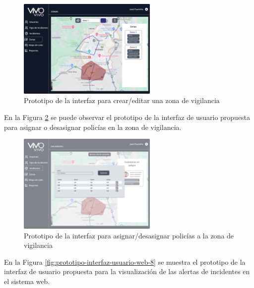 \begin{figure}[H]
      \centering
      \includegraphics[width=0.6\textwidth]{chapters/III-resultados-y-discusion/resources/images/prototipo-formulario-zona-vigilancia-web.png}
      \caption{Prototipo de la interfaz para crear/editar una zona de vigilancia}
      \label{fig:prototipo-interfaz-usuario-web-6}
\end{figure}

En la Figura \ref{fig:prototipo-interfaz-usuario-web-7} se puede observar el prototipo de la interfaz de usuario propuesta
para asignar o desasignar policías en la zona de vigilancia.

\begin{figure}[H]
      \centering
      \includegraphics[width=0.6\textwidth]{chapters/III-resultados-y-discusion/resources/images/prototipo-asignar-policias-zona-vigilancia.png}
      \caption{Prototipo de la interfaz para asignar/desasignar policías a la zona de vigilancia}
      \label{fig:prototipo-interfaz-usuario-web-7}
\end{figure}

En la Figura \ref{fig:prototipo-interfaz-usuario-web-8} se muestra el prototipo de la interfaz de usuario propuesta para
la visualización de las alertas de incidentes en el sistema web.

